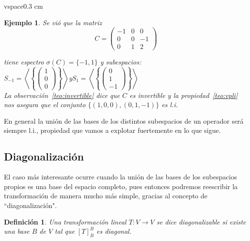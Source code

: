 \documentclass[12pt]{book}
\newtheorem{defi}{Definici\'on}
\newtheorem{ejem}{Ejemplo}
\begin{document}
vspace{0.3 cm}

\begin{ejem} {\em Se vi\'o que la matriz
$$C=\left(\begin{matrix} -1 & 0 & 0 \\ 0 & 0 & -1 \\ 0 & 1 & 2 \end{matrix}\right)$$

tiene espectro $\sigma(C)=\{-1,1\}$ y subespacios:\\

\hspace{4 cm}$S_{-1}=\left\langle\left\{\left(\begin{matrix} 1 \\ 0  \\ 0 \end{matrix}\right)\right\}\right\rangle$\hspace{1 cm}y\hspace{1 cm}$S_1=\left\langle\left\{\left(\begin{matrix} 0 \\ 1  \\ -1 \end{matrix}\right)\right\}\right\rangle$\\

La observación~\ref{teo:invertible} dice que $C$ es invertible y la propiedad~\ref{teo:vpli} nos asegura que el conjunto $\{(1,0,0),(0,1,-1)\}$ es l.i.
}
\end{ejem}

En general la unión de las bases de los distintos subespacios de un operador será siempre l.i., propiedad que vamos a explotar fuertemente en lo que sigue.



\subsection{Diagonalización}
    



El caso más interesante ocurre cuando la unión de las bases de los subespacios propios es una base del espacio completo, pues entonces podremos reescribir la transformación de manera mucho más simple, gracias al concepto de ``diagonalización".

\begin{defi}
Una transformación lineal $T:V\rightarrow V$ se dice diagonalizable si existe una base $B$ de $V$ tal que $[T]_B^B$ es diagonal.
\end{defi}
\end{document}
